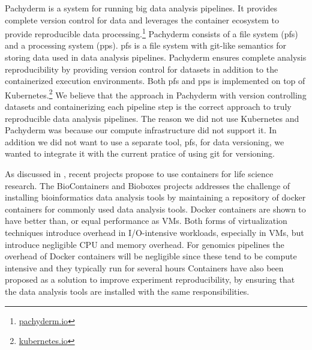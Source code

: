 Pachyderm is a system for running  big data analysis pipelines. It provides
complete version control for data and leverages the container ecosystem to
provide reproducible data processing.\footnote{\url{pachyderm.io}} Pachyderm
consists of a file system (\gls{pfs}) and a processing system (\gls{pps}).
\gls{pfs} is a file system with git-like semantics for storing data used
in data analysis pipelines. Pachyderm ensures complete analysis reproducibility
by providing version control for datasets in addition to the containerized
execution environments. Both \gls{pfs} and \gls{pps} is implemented on top
of Kubernetes.\footnote{\url{kubernetes.io}} We believe that the approach in
Pachyderm with version controlling datasets and containerizing each pipeline
step is the correct approach to truly reproducible data analysis pipelines. 
The reason we did not use Kubernetes and Pachyderm was because our compute
infrastructure did not support it. In addition we did not want to use a separate
tool, \gls{pfs}, for data versioning, we wanted to integrate it with the current
pratice of using git for versioning.  

As discussed in \cite{NIK}, recent projects propose to use containers for life
science research. The BioContainers\cite{biocontainers} and
Bioboxes\cite{belmann2015bioboxes} projects addresses the challenge of
installing bioinformatics data analysis tools by maintaining a repository of
docker containers for commonly used data analysis tools.  
Docker containers are shown to have better than, or equal performance as
VMs.\cite{di2015impact} Both forms of virtualization techniques introduce
overhead in I/O-intensive workloads, especially in VMs, but introduce negligible
CPU and memory overhead.  For genomics pipelines the overhead of Docker
containers will be negligible since these tend to be compute intensive and they
typically run for several hours \cite{di2015impact}
Containers have also been proposed as a solution to improve experiment
reproducibility, by ensuring that the data analysis tools are installed with
the same responsibilities.\cite{boettiger2015introduction} 



